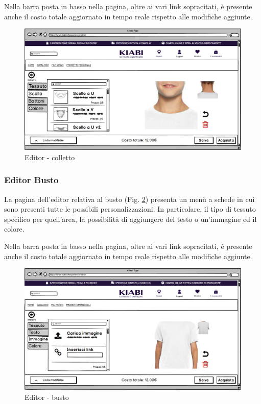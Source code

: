\documentclass[12pt,italian,]{report}
\begin{document}
Nella barra posta in basso nella pagina, oltre ai vari link sopracitati, è presente anche il costo totale aggiornato in tempo reale rispetto alle modifiche aggiunte.

\begin{figure}[h]
\centering
\includegraphics{balsamiq/Editor - caratteristica collo scollo.png}
\caption{Editor - colletto}
\label{editor_colletto}
\end{figure}


\newpage
\subsubsection{Editor Busto} 

La pagina dell'editor relativa al busto (Fig. \ref{editor_busto}) presenta un menù a schede in cui sono presenti tutte le possibili personalizzazioni. In particolare, il tipo di tessuto specifico per quell'area, la possibilità di aggiungere del testo o un'immagine ed il colore.

Nella barra posta in basso nella pagina, oltre ai vari link sopracitati, è presente anche il costo totale aggiornato in tempo reale rispetto alle modifiche aggiunte.

\begin{figure}[h]
\centering
\includegraphics{balsamiq/Editor - caratteristica busto immagine.png}
\caption{Editor - busto}
\label{editor_busto}
\end{figure}
\end{document}
